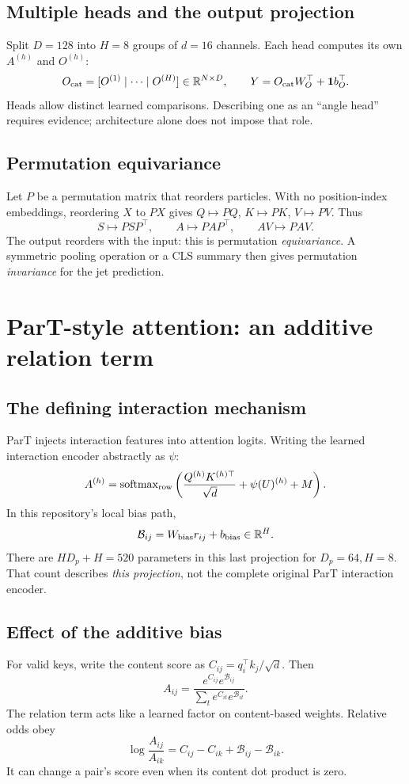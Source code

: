 \documentclass[11pt,a4paper]{article}
\newcommand{\R}{\mathbb R}
\newcommand{\softmax}{\operatorname{softmax}}
\numberwithin{equation}{section}
\begin{document}
\subsection{Multiple heads and the output projection}
Split $D=128$ into $H=8$ groups of $d=16$ channels. Each head computes
its own $A^{(h)}$ and $O^{(h)}$:
\[
 O_{\rm cat}=[O^{(1)}\mid\cdots\mid O^{(H)}]\in\R^{N\times D},
 \qquad Y=O_{\rm cat}W_O^\top+\mathbf1b_O^\top.
\]
Heads allow distinct learned comparisons. Describing one as an ``angle
head'' requires evidence; architecture alone does not impose that role.

\subsection{Permutation equivariance}
Let $P$ be a permutation matrix that reorders particles. With no
position-index embeddings, reordering $X$ to $PX$ gives
$Q\mapsto PQ$, $K\mapsto PK$, $V\mapsto PV$.
Thus
\[
 S\mapsto PSP^\top,\qquad
 A\mapsto PAP^\top,\qquad
 AV\mapsto PAV.
\]
The output reorders with the input: this is permutation
\emph{equivariance}. A symmetric pooling operation or a CLS summary then
gives permutation \emph{invariance} for the jet prediction.

\section{ParT-style attention: an additive relation term}
\subsection{The defining interaction mechanism}
ParT injects interaction features into attention logits.
Writing the learned interaction encoder abstractly as $\psi$:
\begin{equation}\label{eq:part}
 A^{(h)}=\softmax_{\rm row}
 \left(\frac{Q^{(h)}K^{(h)\top}}{\sqrt d}
       +\psi(U)^{(h)}+M\right).
\end{equation}
In this repository's local bias path,
\[
 \mathcal B_{ij}=W_{\rm bias}r_{ij}+b_{\rm bias}\in\R^H.
\]
There are $HD_p+H=520$ parameters in this last projection for $D_p=64,H=8$.
That count describes \emph{this projection}, not the complete original
ParT interaction encoder.

\subsection{Effect of the additive bias}
For valid keys, write the content score as $C_{ij}=q_i^\top k_j/\sqrt d$.
Then
\[
 A_{ij}=
 \frac{e^{C_{ij}}e^{\mathcal B_{ij}}}
 {\sum_t e^{C_{it}}e^{\mathcal B_{it}}}.
\]
The relation term acts like a learned factor on content-based weights.
Relative odds obey
\[
 \log\frac{A_{ij}}{A_{ik}}
 =C_{ij}-C_{ik}+\mathcal B_{ij}-\mathcal B_{ik}.
\]
It can change a pair's score even when its content dot product is zero.
\end{document}
